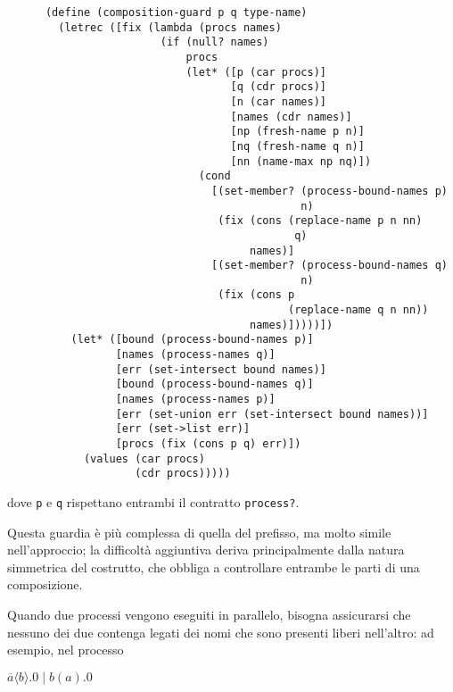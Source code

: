 \begin{lstlisting}
      (define (composition-guard p q type-name)
        (letrec ([fix (lambda (procs names)
                        (if (null? names)
                            procs
                            (let* ([p (car procs)]
                                   [q (cdr procs)]
                                   [n (car names)]
                                   [names (cdr names)]
                                   [np (fresh-name p n)]
                                   [nq (fresh-name q n)]
                                   [nn (name-max np nq)])
                              (cond
                                [(set-member? (process-bound-names p)
                                              n)
                                 (fix (cons (replace-name p n nn)
                                             q)
                                      names)]
                                [(set-member? (process-bound-names q)
                                              n)
                                 (fix (cons p
                                            (replace-name q n nn))
                                      names)]))))])
          (let* ([bound (process-bound-names p)]
                 [names (process-names q)]
                 [err (set-intersect bound names)]
                 [bound (process-bound-names q)]
                 [names (process-names p)]
                 [err (set-union err (set-intersect bound names))]
                 [err (set->list err)]
                 [procs (fix (cons p q) err)])
            (values (car procs)
                    (cdr procs)))))
\end{lstlisting}

dove \lstinline{p} e \lstinline{q} rispettano entrambi il contratto
\lstinline{process?}.

Questa guardia \`e pi\`u complessa di quella del prefisso, ma molto
simile nell'approccio; la difficolt\`a aggiuntiva deriva principalmente
dalla natura simmetrica del costrutto, che obbliga a controllare
entrambe le parti di una composizione.

Quando due processi vengono eseguiti in parallelo, bisogna assicurarsi
che nessuno dei due contenga legati dei nomi che sono presenti liberi
nell'altro: ad esempio, nel processo

\begin{pilisting}
$
    \overline{a}\langle b\rangle.0 \; | \;
    b(a).0
$
\end{pilisting}

